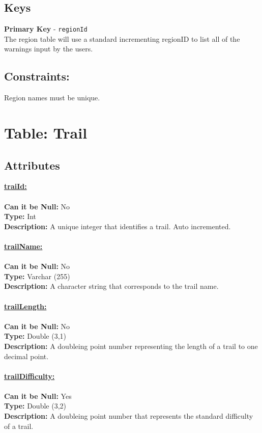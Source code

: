\subsection{Keys}
\textbf{Primary Key} - \texttt{regionId}\\
The region table will use a standard incrementing regionID to 
list all of the warnings input by the users.
\subsection{Constraints:} Region names must be unique.



\newpage
\section{Table: Trail}
\subsection{Attributes}
\textbf{\underline{traiId:}}\\\\
\textbf{Can it be Null:} No\\
\textbf{Type:} Int\\
\textbf{Description:} A unique integer that identifies a trail. Auto incremented.\\\\


\textbf{\underline{trailName:}}\\\\
\textbf{Can it be Null:} No\\
\textbf{Type:} Varchar (255)\\
\textbf{Description:} A character string that corresponds to the trail name.\\\\


\textbf{\underline{trailLength:}}\\\\
\textbf{Can it be Null:} No\\
\textbf{Type:} Double (3,1)\\
\textbf{Description:} A doubleing point number representing the length
of a trail to one decimal point. \\\\


\textbf{\underline{trailDifficulty:}}\\\\
\textbf{Can it be Null:} Yes\\
\textbf{Type:} Double (3,2)\\
\textbf{Description:} A doubleing point number that represents the standard 
difficulty of a trail.\\\\



